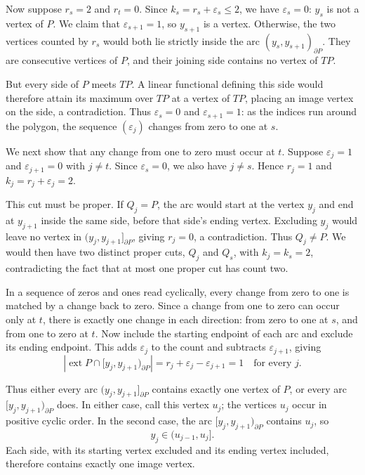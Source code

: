 \documentclass[11pt,a4paper]{article}
\DeclareMathOperator{\ext}{ext}
\theoremstyle{definition}
\theoremstyle{remark}
\numberwithin{equation}{section}
\begin{document}
Now suppose $r_s=2$ and $r_t=0$. Since $k_s=r_s+\varepsilon_s\le2$, we have $\varepsilon_s=0$: $y_s$ is not a vertex of $P$. We claim that $\varepsilon_{s+1}=1$, so $y_{s+1}$ is a vertex. Otherwise, the two vertices counted by $r_s$ would both lie strictly inside the arc $(y_s,y_{s+1})_{\partial P}$. They are consecutive vertices of $P$, and their joining side contains no vertex of $TP$.

But every side of $P$ meets $TP$. A linear functional defining this side would therefore attain its maximum over $TP$ at a vertex of $TP$, placing an image vertex on the side, a contradiction. Thus $\varepsilon_s=0$ and $\varepsilon_{s+1}=1$: as the indices run around the polygon, the sequence $(\varepsilon_j)$ changes from zero to one at $s$.

We next show that any change from one to zero must occur at $t$. Suppose $\varepsilon_j=1$ and $\varepsilon_{j+1}=0$ with $j\ne t$. Since $\varepsilon_s=0$, we also have $j\ne s$. Hence $r_j=1$ and $k_j=r_j+\varepsilon_j=2$.

This cut must be proper. If $Q_j=P$, the arc would start at the vertex $y_j$ and end at $y_{j+1}$ inside the same side, before that side's ending vertex. Excluding $y_j$ would leave no vertex in $(y_j,y_{j+1}]_{\partial P}$, giving $r_j=0$, a contradiction. Thus $Q_j\ne P$. We would then have two distinct proper cuts, $Q_j$ and $Q_s$, with $k_j=k_s=2$, contradicting the fact that at most one proper cut has count two.

In a sequence of zeros and ones read cyclically, every change from zero to one is matched by a change back to zero. Since a change from one to zero can occur only at $t$, there is exactly one change in each direction: from zero to one at $s$, and from one to zero at $t$. Now include the starting endpoint of each arc and exclude its ending endpoint. This adds $\varepsilon_j$ to the count and subtracts $\varepsilon_{j+1}$, giving
\[
 |\ext P\cap[y_j,y_{j+1})_{\partial P}|
 =r_j+\varepsilon_j-\varepsilon_{j+1}=1
 \quad\text{for every }j.
\]

Thus either every arc $(y_j,y_{j+1}]_{\partial P}$ contains exactly one vertex of $P$, or every arc $[y_j,y_{j+1})_{\partial P}$ does. In either case, call this vertex $u_j$; the vertices $u_j$ occur in positive cyclic order. In the second case, the arc $[y_j,y_{j+1})_{\partial P}$ contains $u_j$, so
\[
 y_j\in(u_{j-1},u_j].
\]
Each side, with its starting vertex excluded and its ending vertex included, therefore contains exactly one image vertex.
\end{document}
